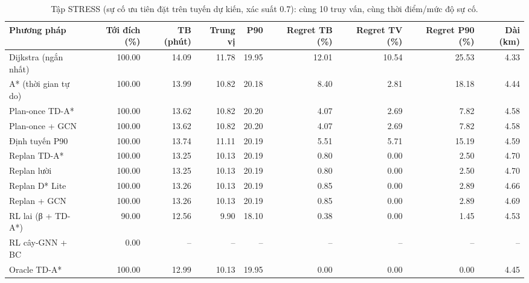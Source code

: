 \begin{table}[!htbp]
\centering
\small
\caption{Tập STRESS (sự cố ưu tiên đặt trên tuyến dự kiến, xác suất 0.7): cùng 10 truy vấn, cùng thời điểm/mức độ sự cố.}
\label{tab:tab_stress}
\begin{adjustbox}{max width=\linewidth}
\begin{tabular}{lrrrrrrrr}
\toprule
Phương pháp & Tới đích (\%) & TB (phút) & Trung vị & P90 & Regret TB (\%) & Regret TV (\%) & Regret P90 (\%) & Dài (km) \\
\midrule
Dijkstra (ngắn nhất) & 100.00 & 14.09 & 11.78 & 19.95 & 12.01 & 10.54 & 25.53 & 4.33 \\
A* (thời gian tự do) & 100.00 & 13.99 & 10.82 & 20.18 & 8.40 & 2.81 & 18.18 & 4.44 \\
Plan-once TD-A* & 100.00 & 13.62 & 10.82 & 20.20 & 4.07 & 2.69 & 7.82 & 4.58 \\
Plan-once + GCN & 100.00 & 13.62 & 10.82 & 20.20 & 4.07 & 2.69 & 7.82 & 4.58 \\
Định tuyến P90 & 100.00 & 13.74 & 11.11 & 20.19 & 5.51 & 5.71 & 15.19 & 4.59 \\
Replan TD-A* & 100.00 & 13.25 & 10.13 & 20.19 & 0.80 & 0.00 & 2.50 & 4.70 \\
Replan lười & 100.00 & 13.25 & 10.13 & 20.19 & 0.80 & 0.00 & 2.50 & 4.70 \\
Replan D* Lite & 100.00 & 13.26 & 10.13 & 20.19 & 0.85 & 0.00 & 2.89 & 4.66 \\
Replan + GCN & 100.00 & 13.26 & 10.13 & 20.19 & 0.85 & 0.00 & 2.89 & 4.69 \\
RL lai (β + TD-A*) & 90.00 & 12.56 & 9.90 & 18.10 & 0.38 & 0.00 & 1.45 & 4.53 \\
RL cây-GNN + BC & 0.00 & -- & -- & -- & -- & -- & -- & -- \\
Oracle TD-A* & 100.00 & 12.99 & 10.13 & 19.95 & 0.00 & 0.00 & 0.00 & 4.45 \\
\bottomrule
\end{tabular}
\end{adjustbox}
\end{table}
